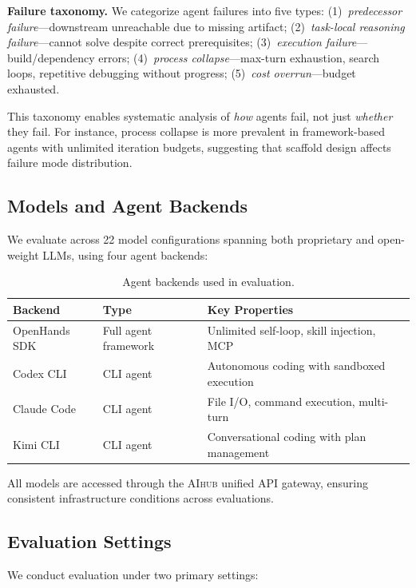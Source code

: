 \textbf{Failure taxonomy.}
We categorize agent failures into five types:
(1)~\emph{predecessor failure}---downstream unreachable due to missing artifact;
(2)~\emph{task-local reasoning failure}---cannot solve despite correct prerequisites;
(3)~\emph{execution failure}---build/dependency errors;
(4)~\emph{process collapse}---max-turn exhaustion, search loops, repetitive debugging without progress;
(5)~\emph{cost overrun}---budget exhausted.

This taxonomy enables systematic analysis of \emph{how} agents fail, not just \emph{whether} they fail.
For instance, process collapse is more prevalent in framework-based agents with unlimited iteration budgets, suggesting that scaffold design affects failure mode distribution.

\subsection{Models and Agent Backends}

We evaluate \eva{} across 22 model configurations spanning both proprietary and open-weight LLMs, using four agent backends:

\begin{table}[t]
\centering
\small
\begin{tabular}{lll}
\toprule
\textbf{Backend} & \textbf{Type} & \textbf{Key Properties} \\
\midrule
OpenHands SDK & Full agent framework & Unlimited self-loop, skill injection, MCP \\
Codex CLI & CLI agent & Autonomous coding with sandboxed execution \\
Claude Code & CLI agent & File I/O, command execution, multi-turn \\
Kimi CLI & CLI agent & Conversational coding with plan management \\
\bottomrule
\end{tabular}
\caption{Agent backends used in \eva{} evaluation.}
\label{tab:backends}
\end{table}

All models are accessed through the \textsc{AIhub} unified API gateway, ensuring consistent infrastructure conditions across evaluations.

\subsection{Evaluation Settings}

We conduct evaluation under two primary settings:


